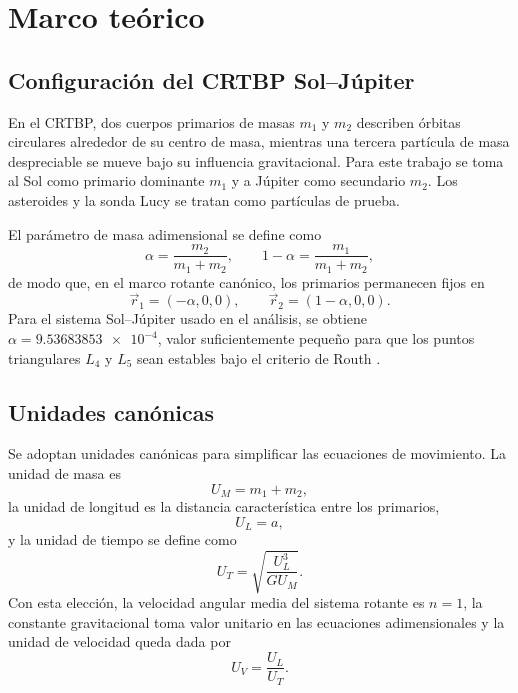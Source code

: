 \documentclass[12pt,a4paper]{article}
\begin{document}
\section{Marco teórico}
\subsection{Configuración del CRTBP Sol--Júpiter}
En el CRTBP, dos cuerpos primarios de masas \(m_1\) y \(m_2\) describen órbitas circulares alrededor de su centro de masa, mientras una tercera partícula de masa despreciable se mueve bajo su influencia gravitacional. Para este trabajo se toma al Sol como primario dominante \(m_1\) y a Júpiter como secundario \(m_2\). Los asteroides y la sonda Lucy se tratan como partículas de prueba.

El parámetro de masa adimensional se define como
\begin{equation}
\alpha=\frac{m_2}{m_1+m_2},\qquad 1-\alpha=\frac{m_1}{m_1+m_2},
\end{equation}
de modo que, en el marco rotante canónico, los primarios permanecen fijos en
\begin{equation}
\vec r_1=(-\alpha,0,0),\qquad \vec r_2=(1-\alpha,0,0).
\end{equation}
Para el sistema Sol--Júpiter usado en el análisis, se obtiene \(\alpha=\num{9.53683853e-4}\), valor suficientemente pequeño para que los puntos triangulares \(L_4\) y \(L_5\) sean estables bajo el criterio de Routh \cite{zuluaga_mecanica_celeste,murray1999solar}.

\subsection{Unidades canónicas}
Se adoptan unidades canónicas para simplificar las ecuaciones de movimiento. La unidad de masa es
\begin{equation}
U_M=m_1+m_2,
\end{equation}
la unidad de longitud es la distancia característica entre los primarios,
\begin{equation}
U_L=a,
\end{equation}
y la unidad de tiempo se define como
\begin{equation}
U_T=\sqrt{\frac{U_L^3}{G U_M}}.
\end{equation}
Con esta elección, la velocidad angular media del sistema rotante es \(n=1\), la constante gravitacional toma valor unitario en las ecuaciones adimensionales y la unidad de velocidad queda dada por
\begin{equation}
U_V=\frac{U_L}{U_T}.
\end{equation}
\end{document}
